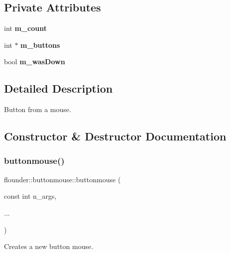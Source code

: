\subsection*{Private Attributes}
\begin{DoxyCompactItemize}
\item 
\mbox{\label{classflounder_1_1buttonmouse_abedc20e1fc3ccc65a4e0c64ebe801935}} 
int {\bfseries m\+\_\+count}
\item 
\mbox{\label{classflounder_1_1buttonmouse_a8e520120c157797cfe59c267eac13689}} 
int $\ast$ {\bfseries m\+\_\+buttons}
\item 
\mbox{\label{classflounder_1_1buttonmouse_aa65460a6d76ece35fd264bc7a5185b47}} 
bool {\bfseries m\+\_\+was\+Down}
\end{DoxyCompactItemize}


\subsection{Detailed Description}
Button from a mouse. 



\subsection{Constructor \& Destructor Documentation}
\mbox{\label{classflounder_1_1buttonmouse_a6721eb42c25bc50c2a4db56ca27c4cda}} 
\subsubsection{\texorpdfstring{buttonmouse()}{buttonmouse()}}
{\footnotesize\ttfamily flounder\+::buttonmouse\+::buttonmouse (\begin{DoxyParamCaption}\item[{const int}]{n\+\_\+args,  }\item[{}]{... }\end{DoxyParamCaption})}



Creates a new button mouse. 


